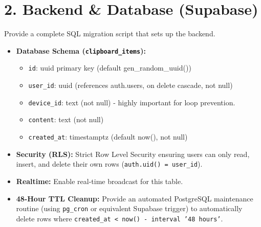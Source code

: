 \documentclass[11pt, a4paper]{article}
\begin{document}
\section*{2. Backend \& Database (Supabase)}
Provide a complete SQL migration script that sets up the backend.
\begin{itemize}
    \item \textbf{Database Schema (\texttt{clipboard\_items}):}
    \begin{itemize}
        \item \texttt{id}: uuid primary key (default gen\_random\_uuid())
        \item \texttt{user\_id}: uuid (references auth.users, on delete cascade, not null)
        \item \texttt{device\_id}: text (not null) - highly important for loop prevention.
        \item \texttt{content}: text (not null)
        \item \texttt{created\_at}: timestamptz (default now(), not null)
    \end{itemize}
    \item \textbf{Security (RLS):} Strict Row Level Security ensuring users can only read, insert, and delete their own rows (\texttt{auth.uid() = user\_id}).
    \item \textbf{Realtime:} Enable real-time broadcast for this table.
    \item \textbf{48-Hour TTL Cleanup:} Provide an automated PostgreSQL maintenance routine (using \texttt{pg\_cron} or equivalent Supabase trigger) to automatically delete rows where \texttt{created\_at < now() - interval '48 hours'}.
\end{itemize}
\end{document}
